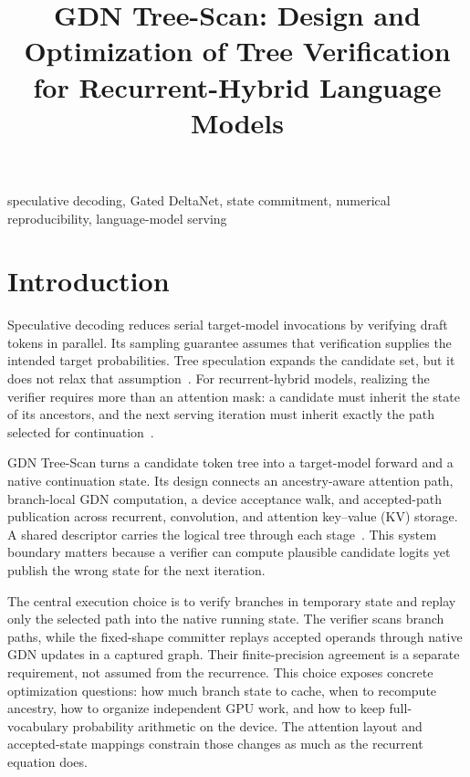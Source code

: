 \documentclass[conference]{IEEEtran}
\newcommand{\sys}{GDN Tree-Scan}
\begin{document}
\title{GDN Tree-Scan: Design and Optimization of Tree Verification for Recurrent-Hybrid Language Models}
\author{
}
\maketitle

\begin{IEEEkeywords}
speculative decoding, Gated DeltaNet, state commitment, numerical reproducibility, language-model serving
\end{IEEEkeywords}

\section{Introduction}
Speculative decoding reduces serial target-model invocations by verifying draft tokens in parallel. Its sampling guarantee assumes that verification supplies the intended target probabilities. Tree speculation expands the candidate set, but it does not relax that assumption~\cite{leviathan2023fast,chen2023sampling,miao2023specinfer}. For recurrent-hybrid models, realizing the verifier requires more than an attention mask: a candidate must inherit the state of its ancestors, and the next serving iteration must inherit exactly the path selected for continuation~\cite{yang2024gated,wu2025stree}.

\sys{} turns a candidate token tree into a target-model forward and a native continuation state. Its design connects an ancestry-aware attention path, branch-local GDN computation, a device acceptance walk, and accepted-path publication across recurrent, convolution, and attention key--value (KV) storage. A shared descriptor carries the logical tree through each stage~\cite{lumo2026archive,lumo2026stateless}. This system boundary matters because a verifier can compute plausible candidate logits yet publish the wrong state for the next iteration.

The central execution choice is to verify branches in temporary state and replay only the selected path into the native running state. The verifier scans branch paths, while the fixed-shape committer replays accepted operands through native GDN updates in a captured graph. Their finite-precision agreement is a separate requirement, not assumed from the recurrence. This choice exposes concrete optimization questions: how much branch state to cache, when to recompute ancestry, how to organize independent GPU work, and how to keep full-vocabulary probability arithmetic on the device. The attention layout and accepted-state mappings constrain those changes as much as the recurrent equation does.
\end{document}
